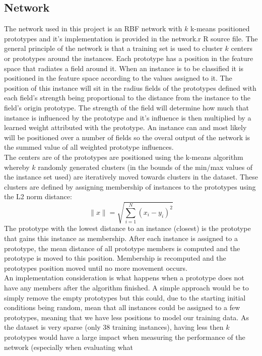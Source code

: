 \documentclass[twocolumn]{article}
\begin{document}
\subsection{Network}
The network used in this project is an RBF network with $k$ k-means positioned prototypes and it's implementation is provided in the network.r R source file. 
The general principle of the network is that a training set is used to cluster $k$ centers or prototypes around the instances. Each prototype
has a position in the feature space that radiates a field around it. When an instance is to be classified it is positioned in the feature space according
to the values assigned to it. The position of this instance will sit in the radius fields of the prototypes defined with each field's strength being
proportional to the distance from the instance to the field's origin prototype. The strength of the field will determine how much that instance is
influenced by the prototype and it's influence is then multiplied by a learned weight attributed with the prototype. An instance can and most likely 
will be positioned over a number of fields so the overal output of the network is the summed value of all weighted prototype influences.\\
The centers are of the prototypes are positioned using the k-means algorithm whereby $k$ randomly generated clusters (in the bounds of the min/max 
values of the instance set used) are iteratively moved towards clusters in the dataset. These clusters are defined by assigning 
membership of instances to the prototypes using the L2 norm distance:
\[
\|x\| = \sqrt{\sum_{i=1}^{N}(x_i - y_i)^2}
\]
The prototype with the lowest distance to an instance (closest) is the prototype that gains this instance as membership. After each instance
is assigned to a prototype, the mean distance of all prototype members is computed and the prototype is moved to this position. Membership is
recomputed and the prototypes position moved until no more movement occurs. \\
An implementation consideration is what happens when a prototype does not have any members after the algorithm finished. A simple approach would
be to simply remove the empty prototypes but this could, due to the starting initial conditions being random, mean that all instances could be
assigned to a few prototypes, meaning that we have less positions to model our training data. As the dataset is very sparse (only 38 training
instances), having less then $k$ prototypes would have a large impact when measuring the performance of the network (especially when evaluating what
\end{document}

